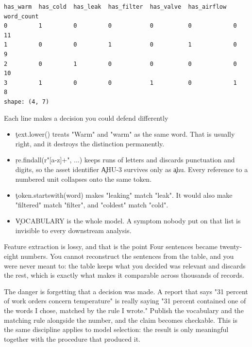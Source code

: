 \begin{lstlisting}[language=text, style=block, caption={Four documents become four rows of numbers}, label={c14_text_features_output}, captionpos=b]
   has_warm  has_cold  has_leak  has_filter  has_valve  has_airflow  word_count
0         1         0         0           0          0            0          11
1         0         0         1           0          1            0           9
2         0         1         0           0          0            0          10
3         1         0         0           1          0            1           8
shape: (4, 7)
\end{lstlisting}

\begin{SyntaxBox}{Each line makes a decision you could defend differently}
\begin{itemize}
    \item \c{text.lower()} treats "Warm" and "warm" as the same word. That is
          usually right, and it destroys the distinction permanently.
    \item \c{re.findall(r"[a-z]+", ...)} keeps runs of letters and discards
          punctuation and digits, so the asset identifier \c{AHU-3} survives
          only as \c{ahu}. Every reference to a numbered unit collapses onto the
          same token.
    \item \c{token.startswith(word)} makes "leaking" match "leak". It would also
          make "filtered" match "filter", and "coldest" match "cold".
    \item \c{VOCABULARY} is the whole model. A symptom nobody put on that list
          is invisible to every downstream analysis.
\end{itemize}
\end{SyntaxBox}

\begin{ExplainBox}{Feature extraction is lossy, and that is the point}
Four sentences became twenty-eight numbers. You cannot reconstruct the sentences
from the table, and you were never meant to: the table keeps what you decided
was relevant and discards the rest, which is exactly what makes it comparable
across thousands of records.

The danger is forgetting that a decision was made. A report that says
"31 percent of work orders concern temperature" is really saying "31 percent
contained one of the words I chose, matched by the rule I wrote." Publish the
vocabulary and the matching rule alongside the number, and the claim becomes
checkable. This is the same discipline  applies to
model selection: the result is only meaningful together with the procedure that
produced it.
\end{ExplainBox}

